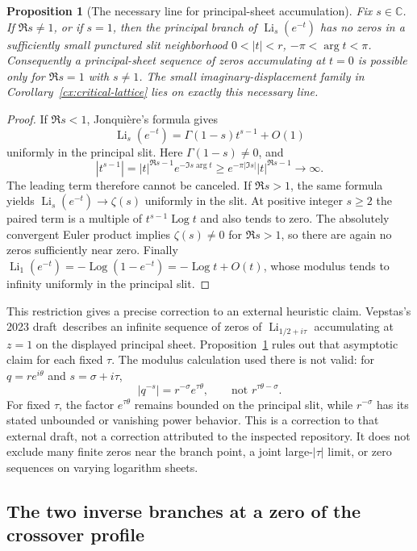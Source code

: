 \documentclass[11pt,a4paper]{article}
\numberwithin{equation}{section}
\newtheorem{proposition}[theorem]{Proposition}
\theoremstyle{definition}
\theoremstyle{remark}
\DeclareMathOperator{\Li}{Li}
\DeclareMathOperator{\Log}{Log}
\begin{document}
\begin{proposition}[The necessary line for principal-sheet accumulation]
\label{cx:necessary-line}
Fix $s\in\mathbb C$.  If $\Re s\ne1$, or if $s=1$, then the principal
branch of $\Li_s(e^{-t})$ has no zeros in a sufficiently small punctured
slit neighborhood $0<|t|<r$, $-\pi<\arg t<\pi$.  Consequently a
principal-sheet sequence of zeros accumulating at $t=0$ is possible only
for $\Re s=1$ with $s\ne1$.  The small imaginary-displacement family in
Corollary~\ref{cx:critical-lattice} lies on exactly this necessary line.
\end{proposition}
\begin{proof}
If $\Re s<1$, Jonqui\`ere's formula gives
\[
 \Li_s(e^{-t})=\Gamma(1-s)t^{s-1}+O(1)
\]
uniformly in the principal slit.  Here $\Gamma(1-s)\ne0$, and
\[
 |t^{s-1}|=|t|^{\Re s-1}
                  e^{-\Im s\arg t}
 \ge e^{-\pi|\Im s|}|t|^{\Re s-1}\longrightarrow\infty.
\]
The leading term therefore cannot be canceled.  If $\Re s>1$, the same
formula yields $\Li_s(e^{-t})\to\zeta(s)$ uniformly in the slit.  At
positive integer $s\ge2$ the paired term is a multiple of
$t^{s-1}\Log t$ and also tends to zero.  The absolutely convergent Euler
product implies $\zeta(s)\ne0$ for $\Re s>1$, so there are again no
zeros sufficiently near zero.  Finally
$\Li_1(e^{-t})=-\Log(1-e^{-t})=-\Log t+O(t)$, whose modulus tends to
infinity uniformly in the principal slit.
\end{proof}

This restriction gives a precise correction to an external heuristic
claim.  Vepstas's 2023 draft\,\cite{vepstas} describes an infinite sequence of zeros of
$\Li_{1/2+i\tau}$ accumulating at $z=1$ on the displayed principal
sheet.  Proposition~\ref{cx:necessary-line} rules out that asymptotic
claim for each fixed $\tau$.  The modulus calculation used there is not
valid: for $q=re^{i\theta}$ and $s=\sigma+i\tau$,
\[
 |q^{-s}|=r^{-\sigma}e^{\tau\theta},
 \qquad\text{not }r^{\tau\theta-\sigma}.
\]
For fixed $\tau$, the factor $e^{\tau\theta}$ remains bounded on the
principal slit, while $r^{-\sigma}$ has its stated unbounded or vanishing
power behavior.  This is a correction to that external draft, not a
correction attributed to the inspected repository.  It does not exclude
many finite zeros near the branch point, a joint large-$|\tau|$ limit, or
zero sequences on varying logarithm sheets.

\subsection{The two inverse branches at a zero of the crossover profile}
\end{document}
